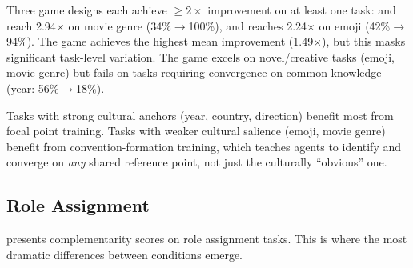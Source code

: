 Three game designs each achieve ${\geq}2\times$ improvement on at least one task: \focalpt and \aidesigned reach 2.94$\times$ on movie genre (34\%$\to$100\%), and \convention reaches 2.24$\times$ on emoji (42\%$\to$94\%).
The \focalpt game achieves the highest mean improvement (1.49$\times$), but this masks significant task-level variation.
The \convention game excels on novel/creative tasks (emoji, movie genre) but fails on tasks requiring convergence on common knowledge (year: 56\%$\to$18\%).

Tasks with strong cultural anchors (\eg year, country, direction) benefit most from focal point training.
Tasks with weaker cultural salience (\eg emoji, movie genre) benefit from convention-formation training, which teaches agents to identify and converge on \emph{any} shared reference point, not just the culturally ``obvious'' one.

\subsection{Role Assignment}
\label{sec:roles}

 presents complementarity scores on role assignment tasks.
This is where the most dramatic differences between conditions emerge.

